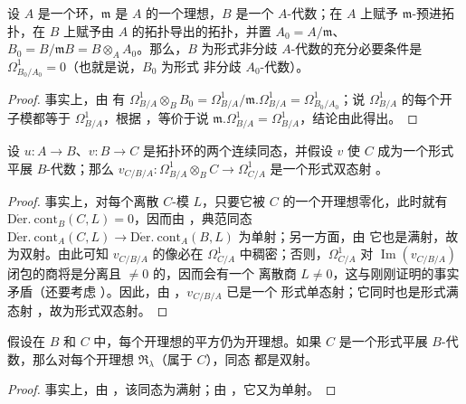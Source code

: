 \begin{corollary}[20.7.5]
\label{0.20.7.5-fr}
设 $A$ 是一个环，$\mathfrak{m}$ 是 $A$ 的一个理想，$B$ 是一个
$A$-代数；在 $A$ 上赋予 $\mathfrak{m}$-预进拓扑，在 $B$ 上赋予由 $A$
的拓扑导出的拓扑，并置 $A_0=A/\mathfrak{m}$、
$B_0=B/\mathfrak{m}B=B\otimes_A A_0$。那么，$B$ 为形式非分歧
$A$-代数的充分必要条件是 $\Omega^1_{B_0/A_0}=0$（也就是说，$B_0$ 为形式
非分歧 $A_0$-代数）。
\end{corollary}

\begin{proof}
事实上，由  有
$\Omega^1_{B/A}\otimes_B B_0=\Omega^1_{B/A}/\mathfrak{m}.\Omega^1_{B/A}
=\Omega^1_{B_0/A_0}$；说 $\Omega^1_{B/A}$ 的每个开子模都等于
$\Omega^1_{B/A}$，根据 ，等价于说
$\mathfrak{m}.\Omega^1_{B/A}=\Omega^1_{B/A}$，结论由此得出。
\end{proof}

\begin{proposition}[20.7.6]
\label{0.20.7.6-fr}
设 $u:A\to B$、$v:B\to C$ 是拓扑环的两个连续同态，并假设 $v$ 使 $C$
成为一个形式平展 $B$-代数；那么
$v_{C/B/A}:\Omega^1_{B/A}\otimes_B C\to\Omega^1_{C/A}$ 是一个形式双态射
。
\end{proposition}

\begin{proof}
事实上，对每个离散 $C$-模 $L$，只要它被 $C$ 的一个开理想零化，此时就有
$\operatorname{D\acute{e}r.\ cont}_B(C,L)=0$，因而由
，典范同态
$\operatorname{D\acute{e}r.\ cont}_A(C,L)\to
\operatorname{D\acute{e}r.\ cont}_A(B,L)$ 为单射；另一方面，由
 它也是满射，故为双射。由此可知 $v_{C/B/A}$ 的像必在
$\Omega^1_{C/A}$ 中稠密；否则，$\Omega^1_{C/A}$ 对
$\operatorname{Im}(v_{C/B/A})$ 闭包的商将是分离且 $\neq0$ 的，因而会有一个
离散商 $L\neq0$，这与刚刚证明的事实矛盾（还要考虑
）。因此，由 ，$v_{C/B/A}$ 已是一个
形式单态射；它同时也是形式满态射 ，故为形式双态射。
\end{proof}

\begin{corollary}[20.7.7]
\label{0.20.7.7-fr}
假设在 $B$ 和 $C$ 中，每个开理想的平方仍为开理想。如果 $C$ 是一个形式平展
$B$-代数，那么对每个开理想 $\mathfrak{R}_\lambda$（属于 $C$），同态
 都是双射。
\end{corollary}

\begin{proof}
事实上，由 ，该同态为满射；由
，它又为单射。
\end{proof}

